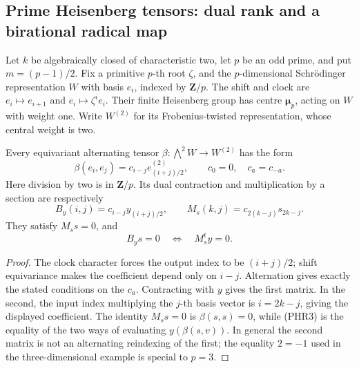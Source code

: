 \subsection{Prime Heisenberg tensors: dual rank and a birational radical map}

Let \(k\) be algebraically closed of characteristic two, let \(p\) be an
odd prime, and put \(m=(p-1)/2\). Fix a primitive \(p\)-th root
\(\zeta\), and the \(p\)-dimensional Schr\"odinger representation \(W\)
with basis \(e_i\), indexed by \(\mathbf Z/p\).
The shift and clock are \(e_i\mapsto e_{i+1}\) and
\(e_i\mapsto\zeta^i e_i\). Their finite Heisenberg group has centre
\(\boldsymbol\mu_p\), acting on \(W\) with weight one.
Write \(W^{(2)}\) for its Frobenius-twisted representation, whose
central weight is two.

\begin{lemma}
\label{lem:prime-Heisenberg-two-contractions}
Every equivariant alternating tensor
\(\beta:\bigwedge^2W\to W^{(2)}\) has the form
\[
 \beta(e_i,e_j)=c_{i-j}e_{(i+j)/2}^{(2)},\qquad
 c_0=0,\quad c_a=c_{-a}.                         \tag{PHR1}
\]
Here division by two is in \(\mathbf Z/p\). Its dual contraction
and multiplication by a section are respectively
\[
 B_y(i,j)=c_{i-j}y_{(i+j)/2},\qquad
 M_s(k,j)=c_{2(k-j)}s_{2k-j}.                    \tag{PHR2}
\]
They satisfy \(M_ss=0\), and
\[
                 B_ys=0\quad\Longleftrightarrow\quad
                 M_s^t y=0.                   \tag{PHR3}
\]
\end{lemma}
\begin{proof}
The clock character forces the output index to be \((i+j)/2\);
shift equivariance makes the coefficient depend only on \(i-j\).
Alternation gives exactly the stated conditions on the \(c_a\).
Contracting with \(y\) gives the first matrix. In the second,
the input index multiplying the \(j\)-th basis vector is
\(i=2k-j\), giving the displayed coefficient.
The identity \(M_ss=0\) is \(\beta(s,s)=0\), while (PHR3)
is the equality of the two ways of evaluating
\(y(\beta(s,v))\). In general the second matrix is not an
alternating reindexing of the first; the equality \(2=-1\)
used in the three-dimensional example is special to \(p=3\).
\end{proof}

